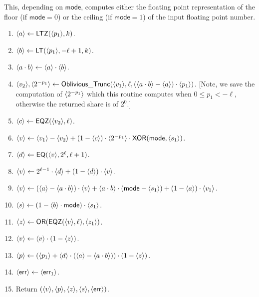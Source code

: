   This, depending on $\mathsf{mode}$, computes either the floating point
  representation of the floor (if $\mathsf{mode}=0$) or the ceiling (if $\mathsf{mode}=1$)
  of the input floating point number.
  \begin{enumerate}
    \item $\langle a \rangle \leftarrow \mathsf{LTZ}(\langle p_1 \rangle,k)$.
    \item $\langle b \rangle \leftarrow \mathsf{LT}(\langle p_1 \rangle,-\ell+1,k)$.
    \item $\langle a \cdot b \rangle \leftarrow \langle a \rangle \cdot \langle b \rangle$.
    \item $\langle v_2 \rangle,\langle 2^{-p_1} \rangle \leftarrow \mathsf{Oblivious\_Trunc}(\langle v_1 \rangle,\ell,(\langle a \cdot b \rangle-\langle a \rangle) \cdot \langle p_1 \rangle)$.
            [Note, we save the computation of $\langle 2^{-p_1} \rangle$ which this routine computes when $0 \le p_1 < -\ell$, otherwise the returned share is of $2^0$.]
    \item $\langle c \rangle \leftarrow \mathsf{EQZ}(\langle v_2 \rangle,\ell)$.
    \item $\langle v \rangle \leftarrow \langle v_1 \rangle-\langle v_2 \rangle+(1-\langle c \rangle) \cdot \langle 2^{-p_1} \rangle
            \cdot \mathsf{XOR}(\mathsf{mode},\langle s_1 \rangle)$.
    \item $\langle d \rangle \leftarrow \mathsf{EQ}(\langle v \rangle,2^\ell,\ell+1)$.
    \item $\langle v \rangle \leftarrow 2^{\ell-1} \cdot \langle d \rangle + (1-\langle d \rangle) \cdot \langle v \rangle$.
    \item $\langle v \rangle \leftarrow (\langle a \rangle-\langle a \cdot b \rangle) \cdot \langle v \rangle
            + \langle a \cdot b \rangle \cdot (\mathsf{mode}-\langle s_1 \rangle)
            + (1-\langle a \rangle) \cdot \langle v_1 \rangle$.
    \item $\langle s \rangle \leftarrow (1-\langle b \rangle \cdot \mathsf{mode}) \cdot \langle s_1 \rangle$.
    \item $\langle z \rangle \leftarrow \mathsf{OR}(\mathsf{EQZ}(\langle v \rangle,\ell),\langle z_1 \rangle)$.
    \item $\langle v \rangle \leftarrow \langle v \rangle \cdot (1-\langle z \rangle)$.
    \item $\langle p \rangle \leftarrow (\langle p_1 \rangle+\langle d \rangle \cdot (\langle a \rangle-\langle a \cdot b \rangle)) \cdot (1-\langle z \rangle)$.
    \item $\langle \mathsf{err} \rangle \leftarrow \langle \mathsf{err}_1 \rangle$.
    \item Return $(\langle v \rangle,\langle p \rangle,\langle z \rangle,\langle s \rangle,\langle \mathsf{err} \rangle)$.
  \end{enumerate}

